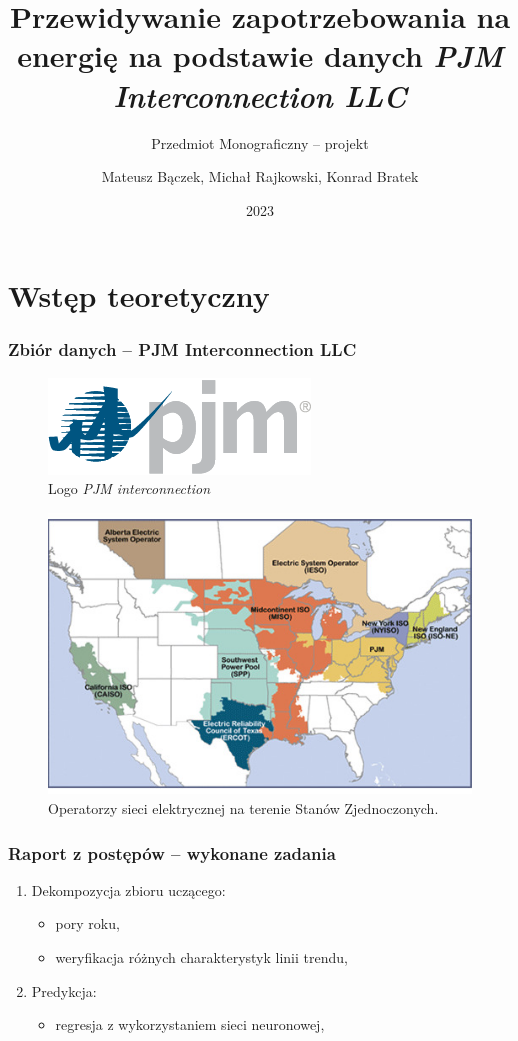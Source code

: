 \documentclass[]{beamer}
\title{Przewidywanie zapotrzebowania na energię na podstawie danych \textit{PJM Interconnection LLC}}
\subtitle{Przedmiot Monograficzny -- projekt}
\author{Mateusz Bączek, Michał Rajkowski, Konrad Bratek}
\institute{Politechnika Wrocławska}
\date{2023}
\begin{document}
\frame{\titlepage}

\section{Wstęp teoretyczny}

\begin{frame}
\frametitle{Zbiór danych -- PJM Interconnection LLC}
  \begin{figure}
    \centering
    \includegraphics[width=0.3\linewidth]{pjm-logo.png}
    \vspace{-0.3cm}
    \caption{Logo \textit{PJM interconnection}}
  \end{figure}
  \vspace{-0.5cm}
  \begin{figure}
    \centering
    \includegraphics[width=0.6\linewidth]{rto_map.jpg}
    \vspace{-0.3cm}
    \caption{Operatorzy sieci elektrycznej na terenie Stanów Zjednoczonych.}
  \end{figure}

\end{frame}

\begin{frame}
\frametitle{Raport z postępów -- wykonane zadania}

  \begin{enumerate}
    \item Dekompozycja zbioru uczącego:
      \begin{itemize}
        \item pory roku,
        \item weryfikacja różnych charakterystyk linii trendu,
      \end{itemize}
    \item Predykcja:
      \begin{itemize}
        \item regresja z wykorzystaniem sieci neuronowej,
      \end{itemize}
  \end{enumerate}

\end{frame}
\end{document}
